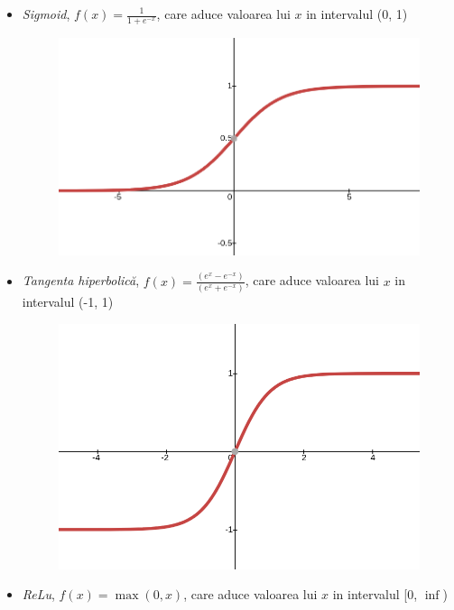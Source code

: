 \documentclass[a4paper,12pt]{book}
\begin{document}
			\begin{itemize}
				\item \textit{Sigmoid},  $f(x) = \frac{1}{1+e^{-x}}$, care aduce valoarea lui $x$ in intervalul (0, 1)
				\begin{figure}[h]
					\centering
					\includegraphics[scale=0.20]{sigmoid}
					\label{fig:nns}
				\end{figure}
				\newline	
				\item \textit{Tangenta hiperbolică},  $f(x) = \frac{(e^x-e^{-x})}{(e^x+e^{-x})}$, care aduce valoarea lui $x$ in intervalul (-1, 1)
				\begin{figure}[!h]
					\centering
					\includegraphics[scale=0.20]{tanh}
					\label{fig:nns}
				\end{figure}	
				\item \textit{ReLu}, $f(x) = \max(0, x)$, care aduce valoarea lui $x$ in intervalul  [0, $\inf$)
				\begin{figure}[!h]

\end{figure}
\end{itemize}
\end{document}

